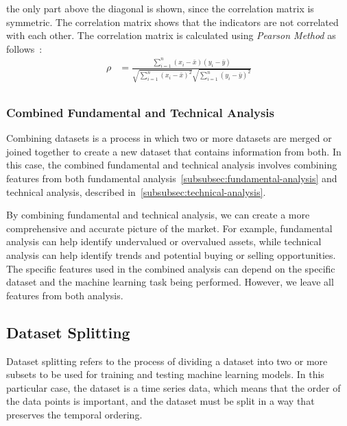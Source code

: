 \documentclass[../xlapes02]{subfiles}
\begin{document}
    the only part above the diagonal is shown, since the correlation matrix is symmetric. The correlation matrix shows that the indicators are not correlated with each other. The correlation matrix is calculated using \emph{Pearson Method} as follows~\cite{enwiki:1146097966}:
    \begin{equation}
        \label{eq:corr}
        \begin{split}
            \rho&=\frac{\sum_{i=1}^{n}(x_i-\bar{x})(y_i-\bar{y})}{\sqrt{\sum_{i=1}^{n}(x_i-\bar{x})^2}\sqrt{\sum_{i=1}^{n}(y_i-\bar{y})^2}}\\
        \end{split}
    \end{equation}

    \subsubsection{Combined Fundamental and Technical Analysis}\label{subsubsec:combined-fundamental-and-technical-analysis}
    Combining datasets is a process in which two or more datasets are merged or joined together to create a new dataset that contains information from both. In this case, the combined fundamental and technical analysis involves combining features from both fundamental analysis~\cref{subsubsec:fundamental-analysis} and technical analysis, described in~\cref{subsubsec:technical-analysis}.

    By combining fundamental and technical analysis, we can create a more comprehensive and accurate picture of the market. For example, fundamental analysis can help identify undervalued or overvalued assets, while technical analysis can help identify trends and potential buying or selling opportunities. The specific features used in the combined analysis can depend on the specific dataset and the machine learning task being performed. However, we leave all features from both analysis.

    \subsection{Dataset Splitting}\label{subsec:dataset-splitting}
    Dataset splitting refers to the process of dividing a dataset into two or more subsets to be used for training and testing machine learning models. In this particular case, the dataset is a time series data, which means that the order of the data points is important, and the dataset must be split in a way that preserves the temporal ordering.
\end{document}

